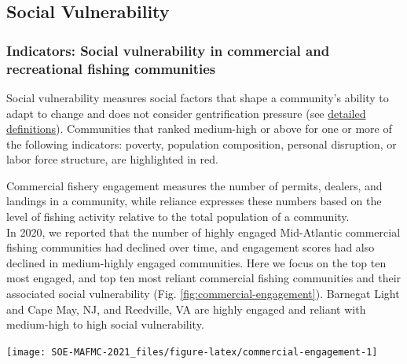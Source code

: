 \documentclass[
  10pt,
]{article}
\let\origfigure\figure
\let\endorigfigure\endfigure
\renewenvironment{figure}[1][2] {
    \expandafter\origfigure\expandafter[H]
} {
    \endorigfigure
}
\begin{document}
\hypertarget{social-vulnerability}{%
\subsection{Social Vulnerability}\label{social-vulnerability}}

\hypertarget{indicators-social-vulnerability-in-commercial-and-recreational-fishing-communities}{%
\subsubsection{Indicators: Social vulnerability in commercial and
recreational fishing
communities}\label{indicators-social-vulnerability-in-commercial-and-recreational-fishing-communities}}

Social vulnerability measures social factors that shape a community's
ability to adapt to change and does not consider gentrification pressure
(see
\href{https://www.fisheries.noaa.gov/national/socioeconomics/social-indicator-definitions}{detailed
definitions}). Communities that ranked medium-high or above for one or
more of the following indicators: poverty, population composition,
personal disruption, or labor force structure, are highlighted in red.

Commercial fishery engagement measures the number of permits, dealers,
and landings in a community, while reliance expresses these numbers
based on the level of fishing activity relative to the total population
of a community.\\
In 2020, we reported that the number of highly engaged Mid-Atlantic
commercial fishing communities had declined over time, and engagement
scores had also declined in medium-highly engaged communities. Here we
focus on the top ten most engaged, and top ten most reliant commercial
fishing communities and their associated social vulnerability (Fig.
\ref{fig:commercial-engagement}). Barnegat Light and Cape May, NJ, and
Reedville, VA are highly engaged and reliant with medium-high to high
social vulnerability.\\

\begin{figure}

{\centering \texttt{[image: SOE-MAFMC-2021\_files/figure-latex/commercial-engagement-1]} 

}

\caption{Commercial engagement, reliance, and social vulnerability for the top commercial fishing communities in the Mid-Atlantic.}\label{fig:commercial-engagement}
\end{figure}
\end{document}
